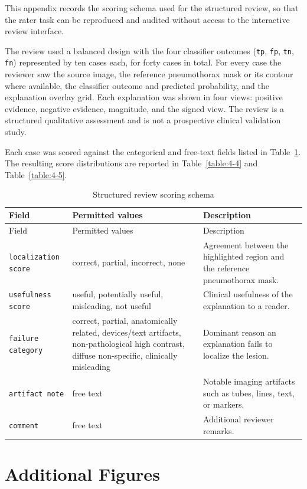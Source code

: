 This appendix records the scoring schema used for the structured review,
so that the rater task can be reproduced and audited without access to
the interactive review interface.

The review used a balanced design with the four classifier outcomes
(\texttt{tp}, \texttt{fp}, \texttt{tn}, \texttt{fn}) represented by ten
cases each, for forty cases in total. For every case the reviewer saw
the source image, the reference pneumothorax mask or its contour where
available, the classifier outcome and predicted probability, and the
explanation overlay grid. Each explanation was shown in four views:
positive evidence, negative evidence, magnitude, and the signed view.
The review is a structured qualitative assessment and is not a
prospective clinical validation study.

Each case was scored against the categorical and free-text fields listed
in Table~\ref{table:b-1}. The resulting score distributions are reported
in Table~\ref{table:4-4} and Table~\ref{table:4-5}.

\begin{longtable}[]{@{}
		>{\raggedright\arraybackslash}p{}
		>{\raggedright\arraybackslash}p{}
		>{\raggedright\arraybackslash}p{}@{}}
	\caption{Structured review scoring schema}\label{table:b-1}\tabularnewline
	\toprule
	Field & Permitted values & Description\tabularnewline
	\midrule
	\endfirsthead
	\toprule
	Field & Permitted values & Description\tabularnewline
	\midrule
	\endhead
	\texttt{localization \allowbreak score} &
	correct, partial, incorrect, none &
	Agreement between the highlighted region and the reference
	pneumothorax mask.\tabularnewline
	\midrule
	\texttt{usefulness \allowbreak score} &
	useful, potentially useful, misleading, not useful &
	Clinical usefulness of the explanation to a reader.\tabularnewline
	\midrule
	\texttt{failure \allowbreak category} &
	correct, partial, anatomically related, devices/text artifacts,
	non-pathological high contrast, diffuse non-specific, clinically
	misleading &
	Dominant reason an explanation fails to localize the lesion.\tabularnewline
	\midrule
	\texttt{artifact \allowbreak note} &
	free text &
	Notable imaging artifacts such as tubes, lines, text, or
	markers.\tabularnewline
	\midrule
	\texttt{comment} &
	free text &
	Additional reviewer remarks.\tabularnewline
	\bottomrule
\end{longtable}

\hypertarget{additional-figures}{%
	\chapter{Additional Figures}\label{additional-figures}}

